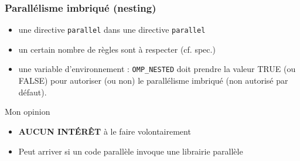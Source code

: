 \documentclass{beamer}
\begin{document}






\begin{frame}
  \frametitle{Parallélisme imbriqué (nesting)}


  \begin{itemize}
\item une directive {\tt parallel} dans une directive {\tt parallel}

\medskip
  
\item un certain nombre de règles sont à respecter (cf. spec.)

  \medskip
  
\item une variable d'environnement : {\tt OMP\_NESTED} doit prendre la
  valeur TRUE (ou FALSE) pour autoriser (ou non) le parallélisme
  imbriqué (non autorisé par défaut). 
\end{itemize}


\begin{alertblock}{Mon opinion}
  \begin{itemize}
  \item \textbf{AUCUN INTÉRÊT} à le faire volontairement
  \item Peut arriver si un code parallèle invoque une librairie parallèle
  \end{itemize}
  
\end{alertblock}

\end{frame}
\end{document}
